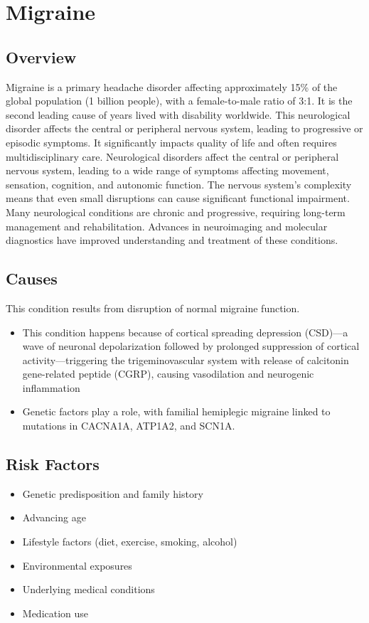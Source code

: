 \chapter{Migraine}
\label{sec:Migraine}

\section{Overview}
Migraine is a primary headache disorder affecting approximately 15\% of the global population (1 billion people), with a female-to-male ratio of 3:1. It is the second leading cause of years lived with disability worldwide. This neurological disorder affects the central or peripheral nervous system, leading to progressive or episodic symptoms. It significantly impacts quality of life and often requires multidisciplinary care. Neurological disorders affect the central or peripheral nervous system, leading to a wide range of symptoms affecting movement, sensation, cognition, and autonomic function. The nervous system's complexity means that even small disruptions can cause significant functional impairment. Many neurological conditions are chronic and progressive, requiring long-term management and rehabilitation. Advances in neuroimaging and molecular diagnostics have improved understanding and treatment of these conditions.
\section{Causes}
This condition results from disruption of normal migraine function.

\begin{itemize}[noitemsep]
  \item This condition happens because of cortical spreading depression (CSD)---a wave of neuronal depolarization followed by prolonged suppression of cortical activity---triggering the trigeminovascular system with release of calcitonin gene-related peptide (CGRP), causing vasodilation and neurogenic inflammation
  \item Genetic factors play a role, with familial hemiplegic migraine linked to mutations in CACNA1A, ATP1A2, and SCN1A.
\end{itemize}
\section{Risk Factors}
\begin{itemize}[noitemsep]
  \item Genetic predisposition and family history
  \item Advancing age
  \item Lifestyle factors (diet, exercise, smoking, alcohol)
  \item Environmental exposures
  \item Underlying medical conditions
  \item Medication use
\end{itemize}
